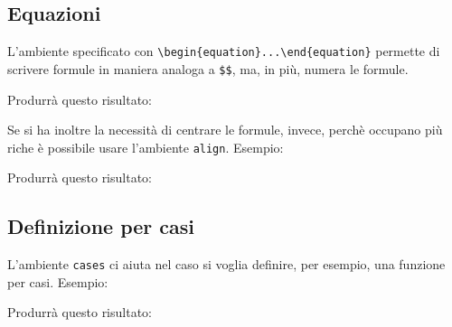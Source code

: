 \subsection{Equazioni}
L'ambiente specificato con \verb!\begin{equation}...\end{equation}! permette 
di scrivere formule in maniera analoga a \verb!$$!, ma, in più, numera le 
formule.

Produrrà questo risultato:\\

\par
Se si ha inoltre la necessità di centrare le formule, invece, perchè occupano 
più riche è possibile usare l'ambiente \verb!align!. Esempio:

Produrrà questo risultato:\\


\subsection{Definizione per casi}
L'ambiente \verb!cases! ci aiuta nel caso si voglia definire, per esempio, una 
funzione per casi. Esempio:

Produrrà questo risultato:\\
